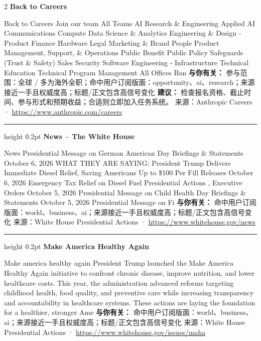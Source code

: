 \documentclass[10.5pt]{ctexart}
\begin{document}
\begin{multicols}{2}
{\large\bfseries Back to Careers}\par
Back to Careers Join our team All Teams AI Research \& Engineering Applied AI Communications Compute Data Science \& Analytics Engineering \& Design - Product Finance Hardware Legal Marketing \& Brand People Product Management, Support, \& Operations Public Benefit Public Policy Safeguards (Trust \& Safety) Sales Security Software Engineering - Infrastructure Technical Education Technical Program Management All Offices Ban
\textbf{与你有关：} 参与范围：全球 / 多为海外全职；命中用户订阅版面：opportunity、ai、research；来源接近一手且权威度高；标题/正文包含高信号变化
\textbf{建议：} 检查报名资格、截止时间、参与形式和预期收益；合适则立即加入任务系统。
{\footnotesize\color{ormuted} 来源：Anthropic Careers · \url{https://www.anthropic.com/careers}}
\vspace{2mm}
\hrule height 0.2pt
\vspace{2mm}
{\large\bfseries News – The White House}\par
News Presidential Message on German American Day Briefings \& Statements October 6, 2026 WHAT THEY ARE SAYING: President Trump Delivers Immediate Diesel Relief, Saving Americans Up to \$100 Per Fill Releases October 6, 2026 Emergency Tax Relief on Diesel Fuel Presidential Actions , Executive Orders October 5, 2026 Presidential Message on Child Health Day Briefings \& Statements October 5, 2026 Presidential Message on Fi
\textbf{与你有关：} 命中用户订阅版面：world、business、ai；来源接近一手且权威度高；标题/正文包含高信号变化
{\footnotesize\color{ormuted} 来源：White House Presidential Actions · \url{https://www.whitehouse.gov/news}}
\vspace{2mm}
\hrule height 0.2pt
\vspace{2mm}
{\large\bfseries Make America Healthy Again}\par
Make america healthy again President Trump launched the Make America Healthy Again initiative to confront chronic disease, improve nutrition, and lower healthcare costs. This year, the administration advanced reforms targeting childhood health, food quality, and preventive care while increasing transparency and accountability in healthcare systems. These actions are laying the foundation for a healthier, stronger Ame
\textbf{与你有关：} 命中用户订阅版面：world、business、ai；来源接近一手且权威度高；标题/正文包含高信号变化
{\footnotesize\color{ormuted} 来源：White House Presidential Actions · \url{https://www.whitehouse.gov/issues/maha}}

\end{multicols}
\end{document}
